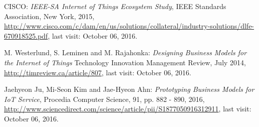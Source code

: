 \begin{thebibliography}{99}
 		  CISCO: \emph{IEEE-SA Internet of Things Ecosystem Study}, IEEE Standards Association, New York, 2015, \url{http://www.cisco.com/c/dam/en/us/solutions/collateral/industry-solutions/dlfe-670918525.pdf}, last visit: October 06, 2016.

 		 M. Westerlund, S. Leminen and M. Rajahonka: \emph{Designing Business Models for the Internet of Things} Technology Innovation Management Review, July 2014, \url{http://timreview.ca/article/807}, last visit: October 06, 2016.

 		 Jaehyeon Ju, Mi-Seon Kim and Jae-Hyeon Ahn: \emph{Prototyping Business Models for IoT Service}, Procedia Computer Science, 91, pp. 882 - 890, 2016, \url{http://www.sciencedirect.com/science/article/pii/S1877050916312911}, last visit: October 06, 2016.
	 \end{thebibliography}







